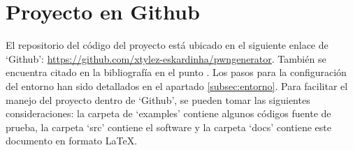 \appendix
\chapter{Proyecto en Github} \label{apendice:git}

El repositorio del código del proyecto está ubicado en el siguiente enlace de `Github': \url{https://github.com/xtylez-eskardinha/pwngenerator}.
También se encuentra citado en la bibliografía en el punto \cite{pwngenerator}.
Los pasos para la configuración del entorno han sido detallados en el apartado \ref{subsec:entorno}.
Para facilitar el manejo del proyecto dentro de `Github', se pueden tomar las siguientes consideraciones: la carpeta de `examples' contiene algunos códigos fuente de prueba, la carpeta `src' contiene el software y la carpeta `docs' contiene este documento en formato \LaTeX.